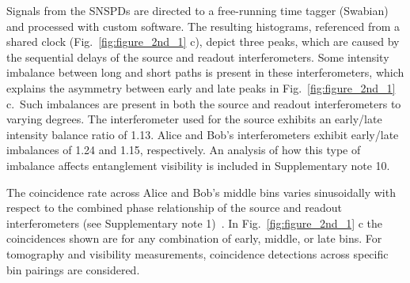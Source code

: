 \documentclass[11pt]{caltech_thesis} %
\begin{document}
Signals from the SNSPDs are directed to a free-running time tagger (Swabian) and processed with custom software. The resulting histograms, referenced from a shared clock (Fig.~\ref{fig:figure_2nd_1} c), depict three peaks, which are caused by the sequential delays of the source and readout interferometers. Some intensity imbalance between long and short paths is present in these interferometers, which explains the asymmetry between early and late peaks in Fig.~\ref{fig:figure_2nd_1} c.~Such imbalances are present in both the source and readout interferometers to varying degrees. The interferometer used for the source exhibits an early/late intensity balance ratio of 1.13. Alice and Bob's interferometers exhibit early/late imbalances of 1.24 and 1.15, respectively. An analysis of how this type of imbalance affects entanglement visibility is included in Supplementary note 10.

The coincidence rate across Alice and Bob's middle bins varies sinusoidally with respect to the combined phase relationship of the source and readout interferometers (see Supplementary note 1)~\autocite{Inagaki2013,Marcikic2002}. In Fig.~\ref{fig:figure_2nd_1} c the coincidences shown are for any combination of early, middle, or late bins. For tomography and visibility measurements, coincidence detections across specific bin pairings are considered.
\end{document}
